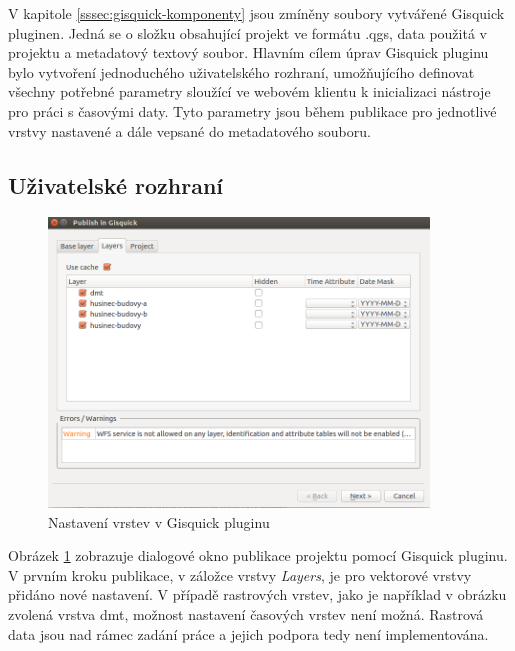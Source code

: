V kapitole \ref{sssec:gisquick-komponenty} jsou zmíněny soubory vytvářené
Gisquick pluginen. 
Jedná se o složku obsahující projekt ve formátu .qgs, data
použitá v projektu a metadatový textový soubor. Hlavním cílem úprav
Gisquick pluginu bylo vytvoření jednoduchého uživatelského rozhraní,
umožňujícího definovat všechny potřebné parametry sloužící ve
webovém klientu k inicializaci nástroje pro práci s časovými daty. Tyto
parametry jsou během publikace pro jednotlivé vrstvy nastavené a dále
vepsané do metadatového souboru.

\subsection{Uživatelské rozhraní}
\label{sssec:plugin-ui}

\begin{figure}[h!]
\centering
\includegraphics[width=0.9\textwidth]{../img/gisquick-plugin.png}
\caption{Nastavení vrstev v Gisquick pluginu}
\label{fig:gisquick-plugin-layers}
\end{figure}

Obrázek \ref{fig:gisquick-plugin-layers} zobrazuje dialogové okno publikace
projektu pomocí Gisquick pluginu. V prvním kroku publikace, v záložce
vrstvy \textit{Layers}, je pro vektorové vrstvy přidáno nové nastavení. V
případě rastrových vrstev, jako je například v obrázku zvolená vrstva dmt,
možnost nastavení časových vrstev není možná. Rastrová data jsou nad rámec 
zadání práce a jejich podpora tedy není implementována.

